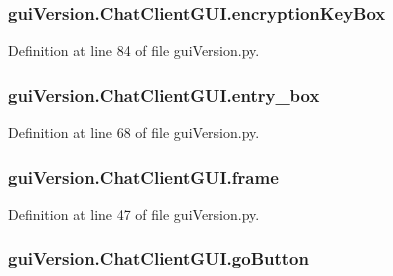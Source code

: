 \subsubsection[{encryption\+Key\+Box}]{\setlength{\rightskip}{0pt plus 5cm}gui\+Version.\+Chat\+Client\+G\+U\+I.\+encryption\+Key\+Box}\label{classgui_version_1_1_chat_client_g_u_i_a61e070d785a0e8308bf1a26788075258}


Definition at line 84 of file gui\+Version.\+py.

\hypertarget{classgui_version_1_1_chat_client_g_u_i_a4436c621e5f3c806218c2756edf488f7}{}
\subsubsection[{entry\+\_\+box}]{\setlength{\rightskip}{0pt plus 5cm}gui\+Version.\+Chat\+Client\+G\+U\+I.\+entry\+\_\+box}\label{classgui_version_1_1_chat_client_g_u_i_a4436c621e5f3c806218c2756edf488f7}


Definition at line 68 of file gui\+Version.\+py.

\hypertarget{classgui_version_1_1_chat_client_g_u_i_a7809572437bc7888072cb612990da273}{}
\subsubsection[{frame}]{\setlength{\rightskip}{0pt plus 5cm}gui\+Version.\+Chat\+Client\+G\+U\+I.\+frame}\label{classgui_version_1_1_chat_client_g_u_i_a7809572437bc7888072cb612990da273}


Definition at line 47 of file gui\+Version.\+py.

\hypertarget{classgui_version_1_1_chat_client_g_u_i_a5a09ecaf8a2c39309f7b7acdea272bc5}{}
\subsubsection[{go\+Button}]{\setlength{\rightskip}{0pt plus 5cm}gui\+Version.\+Chat\+Client\+G\+U\+I.\+go\+Button}\label{classgui_version_1_1_chat_client_g_u_i_a5a09ecaf8a2c39309f7b7acdea272bc5}


